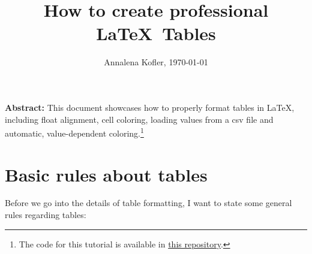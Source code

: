\documentclass{article}
\title{\bfseries\Large How to create professional \LaTeX~Tables}
\author{\normalsize Annalena Kofler, \today}
\date{} %
\begin{document}
\maketitle

\vspace{-1em}
\noindent\textbf{Abstract:} This document showcases how to properly format tables in \LaTeX, 
including float alignment, cell coloring, loading values from a csv file and automatic, value-dependent coloring.\footnote{The code for this tutorial is available in \href{https://github.com/annalena-k/tutorial_latex_formatting}{this repository}.}

\vspace{1em}

\section{Basic rules about tables}
Before we go into the details of table formatting, I want to state some general rules regarding tables:
\end{document}
